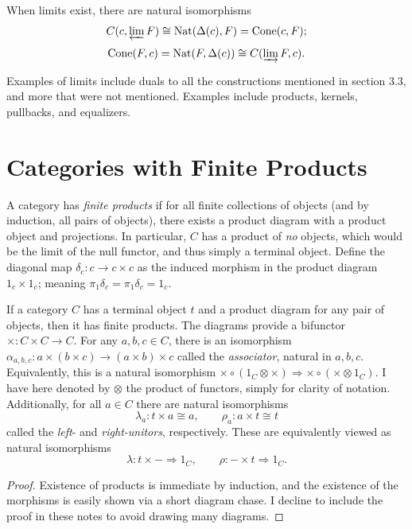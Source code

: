 When limits exist, there are natural isomorphisms
\[
	C(c,\varprojlim F)\cong \operatorname{Nat} (\Delta (c),F)=\operatorname{Cone} (c,F);
\]
\[
	\operatorname{Cone} (F,c)=\operatorname{Nat} (F,\Delta (c))\cong C(\varinjlim F,c)
.\]

Examples of limits include duals to all the constructions mentioned in section 3.3, and more that were not mentioned. Examples include products, kernels, pullbacks, and equalizers.

\section{Categories with Finite Products}

A category has \emph{finite products} if for all finite collections of objects (and by induction, all pairs of objects), there exists a product diagram with a product object and projections. In particular, $C$ has a product of \emph{no} objects, which would be the limit of the null functor, and thus simply a terminal object. Define the diagonal map $\delta _c : c \to c\times c$ as the induced morphism in the product diagram $1_c \times 1_c$; meaning $\pi_1 \delta _c = \pi _1 \delta _c = 1_c$.

\begin{proposition}\label{prp:3.3}
	If a category $C$ has a terminal object $t$ and a product diagram for any pair of objects, then it has finite products. The diagrams provide a bifunctor $\times : C\times C \to C$. For any $a,b,c\in C$, there is an isomorphism $\alpha_{a,b,c} : a\times (b\times c) \to (a\times b)\times c$ called the \emph{associator}, natural in $a,b,c$. Equivalently, this is a natural isomorphism $\times \circ (1_C\otimes \times )\Rightarrow \times \circ (\times \otimes 1_C)$. I have here denoted by $\otimes $ the product of functors, simply for clarity of notation. Additionally, for all $a\in C$ there are natural isomorphisms
	\[
		\lambda_a : t\times a \cong a,\qquad \rho _a : a\times t \cong t
	\]
	called the \emph{left}- and \emph{right-unitors}, respectively. These are equivalently viewed as natural isomorphisms
	\[
		\lambda : t\times - \Rightarrow 1_C,\qquad \rho : -\times t \Rightarrow 1_C
	.\]
\end{proposition}
\begin{proof}
	Existence of products is immediate by induction, and the existence of the morphisms is easily shown via a short diagram chase. I decline to include the proof in these notes to avoid drawing many diagrams.
\end{proof}

